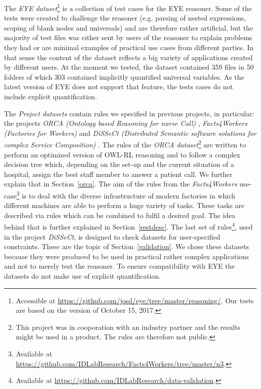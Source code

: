 The \emph{EYE dataset}\footnote{Accessible at \url{https://github.com/josd/eye/tree/master/reasoning/}. Our tests are based on the version of October 15, 2017.} 
%
is a collection of test cases for the EYE reasoner.
Some of the tests were created to challenge the reasoner (e.g. parsing of nested expressions, scoping of blank nodes and universals)
and are therefore rather artificial, 
 but the majority of test files was either sent by users of the reasoner to explain problems they had or are minimal examples of practical use cases from different parties.
 In that sense 
 the content of the dataset 
 reflects a big variety of applications created by different users.
 At the moment we tested, the dataset contained 359 \nthree files in 50 folders of which 303 contained implicitly 
quantified universal variables. 
As the latest version of EYE does not support that feature, the tests cases do not include explicit quantification. 

The \emph{Project datasets} contain rules we specified in previous projects, in particular: 
the projects \emph{ORCA (Ontology based Reasoning for nurse Call)} \cite{ORCA,ORCA2}, \emph{Facts4Workers (Factories for Workers)} \cite{arndt_ruleml_industry_2016} 
and \emph{DiSSeCt (Distributed Semantic software solutions for complex Service Composition)}
\cite{ruleml2017}. 
%
The rules of the 
\emph{ORCA dataset}\footnote{This 
project was in cooporation with an industry partner and the results might be used in a product. The rules are therefore not public.}
 are written to perform an optimized version of OWL-RL reasoning and to follow a complex decision tree which, depending on the set-up and the 
current situation of a hospital, assign the best staff member to answer a patient call. We further explain that in Section~\ref{orca}.
%
The aim of the rules from the \emph{Facts4Workers} use-case\footnote{Available at \url{https://github.com/IDLabResearch/Facts4Workers/tree/master/n3}.}
is to deal with the diverse infrastructure of modern factories in which different machines are able to perform a huge variety of tasks.
These tasks are described via rules which can be combined to fulfil a desired goal. The idea behind that is further explained in Section~\ref{restdesc}.
%
The last set of rules\footnote{Available at \url{https://github.com/IDLabResearch/data-validation}. },
used in the project \emph{DiSSeCt}, is designed to check \rdf datasets for user-specified constraints. These are the topic of Section~\ref{validation}.
%
We chose these datasets because they were produced to be used in practical rather complex applications and not to merely test the reasoner. 
To ensure compatibility with EYE
the datasets do not make use of explicit quantification.

